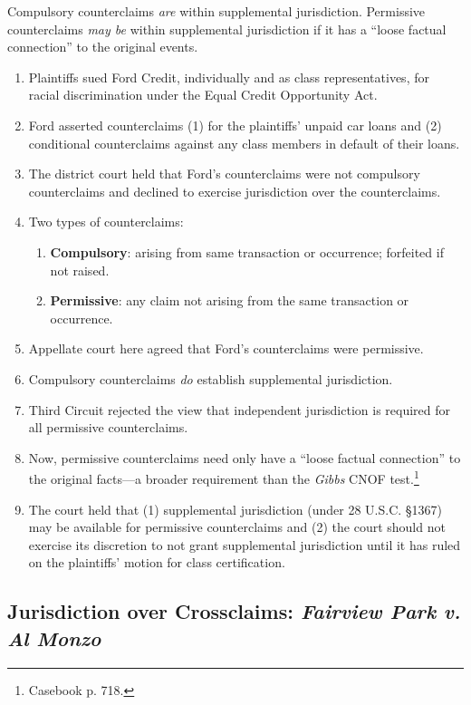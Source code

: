 Compulsory counterclaims \emph{are} within supplemental jurisdiction. 
Permissive counterclaims \emph{may be} within supplemental jurisdiction if it 
has a ``loose factual connection'' to the original events.

\begin{enumerate}
    \item Plaintiffs sued Ford Credit, individually and as class 
    representatives, for racial discrimination under the Equal Credit 
    Opportunity Act.
    \item Ford asserted counterclaims (1) for the plaintiffs' unpaid car loans 
    and (2) conditional counterclaims against any class members in default of 
    their loans.
    \item The district court held that Ford's counterclaims were not compulsory 
    counterclaims and declined to exercise jurisdiction over the 
    counterclaims.
    \item Two types of counterclaims:
    \begin{enumerate}
        \item \textbf{Compulsory}: arising from same transaction or 
        occurrence; forfeited if not raised.
        \item \textbf{Permissive}: any claim not arising from the same 
        transaction or occurrence.
    \end{enumerate}
    \item Appellate court here agreed that Ford's counterclaims were 
    permissive.
    \item Compulsory counterclaims \emph{do} establish supplemental 
    jurisdiction.
    \item Third Circuit rejected the view that independent jurisdiction is 
    required for all permissive counterclaims.
    \item Now, permissive counterclaims need only have a ``loose factual 
    connection'' to the original facts---a broader requirement than the 
    \emph{Gibbs} CNOF test.\footnote{Casebook p. 718.}
    \item The court held that (1) supplemental jurisdiction (under 28 U.S.C. 
    \S 1367) may be available for permissive counterclaims and (2) the court 
    should not exercise its discretion to not grant supplemental jurisdiction 
    until it has ruled on the plaintiffs' motion for class certification.
\end{enumerate}

\subsection{Jurisdiction over Crossclaims: \emph{Fairview Park v. Al Monzo}}

